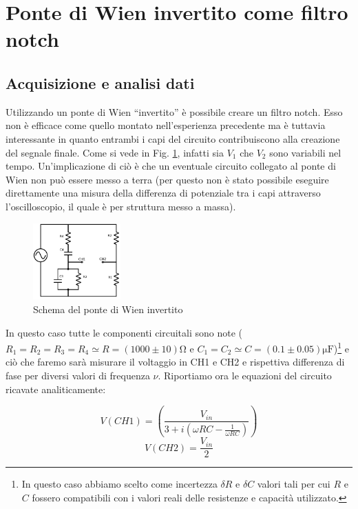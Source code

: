 \section{Ponte di Wien invertito come filtro notch}
\subsection{Acquisizione e analisi dati}
Utilizzando un ponte di Wien ``invertito'' è possibile creare un filtro notch. Esso non è efficace come quello montato nell'esperienza precedente ma è tuttavia interessante in quanto entrambi i capi del circuito contribuiscono alla creazione del segnale finale. Come si vede in Fig. \ref{fig:Winv}, infatti sia $V_1$ che $V_2$ sono variabili nel tempo. Un'implicazione di ciò è che un eventuale circuito collegato al ponte di Wien non può essere messo a terra (per questo non è stato possibile eseguire direttamente una misura della differenza di potenziale tra i capi attraverso l'oscilloscopio, il quale è per struttura messo a massa).
%
\begin{figure}
	\centering
    \includegraphics[width=0.30\textwidth]{schema2.pdf}
    \caption{Schema del ponte di Wien invertito}
    \label{fig:Winv}
\end{figure}

In questo caso tutte le componenti circuitali sono note ($R_1 = R_2 = R_3 = R_4 \simeq R = (1000 \pm 10)\si{\ohm}$ e $C_1 = C_2 \simeq C = (0.1 \pm 0.05)\si{\micro\farad}$)\footnote{In questo caso abbiamo scelto come incertezza $\delta R$ e $\delta C$ valori tali per cui $R$ e $C$ fossero compatibili con i valori reali delle resistenze e capacità utilizzato.} e ciò che faremo sarà misurare il voltaggio in CH1 e CH2 e rispettiva differenza di fase per diversi valori di frequenza $\nu$. Riportiamo ora le equazioni del circuito ricavate analiticamente: 

\noindent
\begin{equation}
V(CH1) = (\frac{V_{in}}{3+i(\omega R C - \frac{1}{\omega R C})})
\label{eq:V1}
\end{equation}
\begin{equation}
V(CH2) = \frac{V_{in}}{2}
\label{eq:V(CH2)}
\end{equation}


